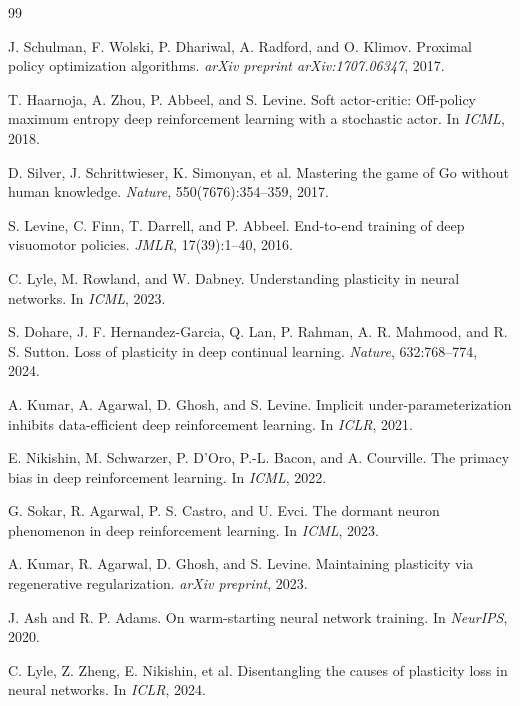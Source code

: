 \documentclass{article}
\begin{document}

\begin{thebibliography}{99}

J. Schulman, F. Wolski, P. Dhariwal, A. Radford, and O. Klimov.
Proximal policy optimization algorithms.
\emph{arXiv preprint arXiv:1707.06347}, 2017.

T. Haarnoja, A. Zhou, P. Abbeel, and S. Levine.
Soft actor-critic: Off-policy maximum entropy deep reinforcement learning with a stochastic actor.
In \emph{ICML}, 2018.

D. Silver, J. Schrittwieser, K. Simonyan, et al.
Mastering the game of Go without human knowledge.
\emph{Nature}, 550(7676):354--359, 2017.

S. Levine, C. Finn, T. Darrell, and P. Abbeel.
End-to-end training of deep visuomotor policies.
\emph{JMLR}, 17(39):1--40, 2016.

C. Lyle, M. Rowland, and W. Dabney.
Understanding plasticity in neural networks.
In \emph{ICML}, 2023.

S. Dohare, J. F. Hernandez-Garcia, Q. Lan, P. Rahman, A. R. Mahmood, and R. S. Sutton.
Loss of plasticity in deep continual learning.
\emph{Nature}, 632:768--774, 2024.

A. Kumar, A. Agarwal, D. Ghosh, and S. Levine.
Implicit under-parameterization inhibits data-efficient deep reinforcement learning.
In \emph{ICLR}, 2021.

E. Nikishin, M. Schwarzer, P. D'Oro, P.-L. Bacon, and A. Courville.
The primacy bias in deep reinforcement learning.
In \emph{ICML}, 2022.

G. Sokar, R. Agarwal, P. S. Castro, and U. Evci.
The dormant neuron phenomenon in deep reinforcement learning.
In \emph{ICML}, 2023.

A. Kumar, R. Agarwal, D. Ghosh, and S. Levine.
Maintaining plasticity via regenerative regularization.
\emph{arXiv preprint}, 2023.

J. Ash and R. P. Adams.
On warm-starting neural network training.
In \emph{NeurIPS}, 2020.

C. Lyle, Z. Zheng, E. Nikishin, et al.
Disentangling the causes of plasticity loss in neural networks.
In \emph{ICLR}, 2024.


\end{thebibliography}
\end{document}
